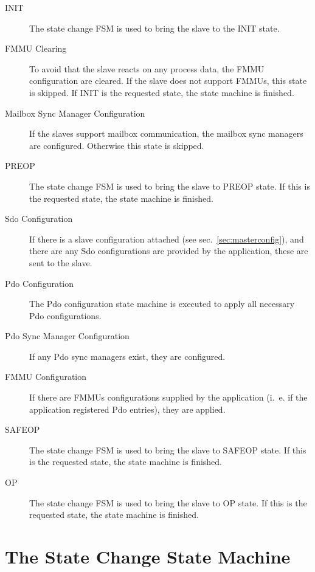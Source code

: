 \documentclass[a4paper,12pt,BCOR6mm,bibtotoc,idxtotoc]{scrbook}
\begin{document}
\begin{description}

\item[INIT] The state change FSM is used to bring the slave to the INIT state.

\item[FMMU Clearing] To avoid that the slave reacts on any process data, the
FMMU configuration are cleared. If the slave does not support FMMUs, this
state is skipped. If INIT is the requested state, the state machine is
finished.

\item[Mailbox Sync Manager Configuration] If the slaves support mailbox
communication, the mailbox sync managers are configured. Otherwise this state
is skipped.

\item[PREOP] The state change FSM is used to bring the slave to PREOP state.
If this is the requested state, the state machine is finished.

\item[Sdo Configuration] If there is a slave configuration attached (see
sec.~\ref{sec:masterconfig}), and there are any Sdo configurations are
provided by the application, these are sent to the slave.

\item[Pdo Configuration] The Pdo configuration state machine is executed to
apply all necessary Pdo configurations.

\item[Pdo Sync Manager Configuration] If any Pdo sync managers exist, they are
configured.

\item[FMMU Configuration] If there are FMMUs configurations supplied by the
application (i.~e. if the application registered Pdo entries), they are
applied. 

\item[SAFEOP] The state change FSM is used to bring the slave to SAFEOP state.
If this is the requested state, the state machine is finished.

\item[OP] The state change FSM is used to bring the slave to OP state.
If this is the requested state, the state machine is finished.

\end{description}


\section{The State Change State Machine}
\label{sec:fsm-change}
\end{document}
